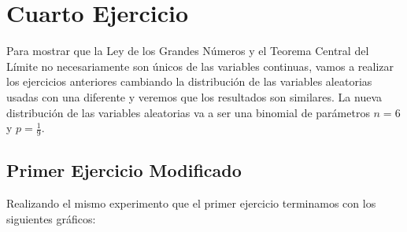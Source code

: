 \documentclass[a4paper]{article}
\begin{document}
	\newpage
	
	\section{Cuarto Ejercicio}
	
	Para mostrar que la Ley de los Grandes N\'umeros y el Teorema Central del L\'imite no necesariamente son \'unicos de las variables continuas, vamos a realizar los ejercicios anteriores cambiando la distribuci\'on de las variables aleatorias usadas con una diferente y veremos que los resultados son similares.
	La nueva distribuci\'on de las variables aleatorias va a ser una binomial de par\'ametros $n = 6$ y $p = \frac{1}{9}$.
	
	\subsection{Primer Ejercicio Modificado}
	
	Realizando el mismo experimento que el primer ejercicio terminamos con los siguientes gr\'aficos:
	
\end{document}
